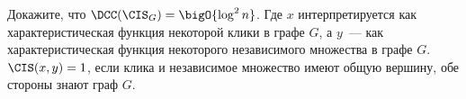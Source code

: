 Докажите, что $\DCC(\CIS_G) = \bigO{\log^2 n}$. Где $x$ интерпретируется как характеристическая функция
некоторой клики в графе $G$, а $y$~--- как характеристическая функция некоторого независимого множества в
графе $G$. $\CIS(x, y) = 1$, если клика и независимое множество имеют общую вершину, обе стороны
знают граф $G$.
